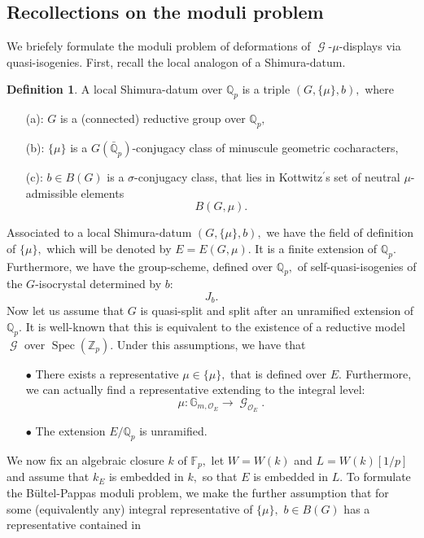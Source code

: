 \documentclass[a4paper,10,5 pt]{amsart}
\theoremstyle{definition}
\newtheorem{Definition}{Definition}
\DeclareMathOperator{\Spec}{Spec}
\DeclareMathOperator{\G}{\mathcal{G}}
\begin{document}
\subsection{Recollections on the moduli problem}
We briefely formulate the moduli problem of deformations of $\G$-$\mu$-displays via quasi-isogenies. First, recall the local analogon of a Shimura-datum.
\begin{Definition}
A local Shimura-datum over $\mathbb{Q}_{p}$ is a triple $(G,\lbrace \mu \rbrace,b),$ where
\begin{enumerate}
\item[(a):] $G$ is a (connected) reductive group over $\mathbb{Q}_{p},$
\item[(b):] $\lbrace \mu \rbrace$ is a $G(\bar{\mathbb{Q}}_{p})$-conjugacy class of minuscule geometric cocharacters,
\item[(c):] $b\in B(G)$ is a $\sigma$-conjugacy class, that lies in Kottwitz$^{\prime}$s set of neutral $\mu$-admissible elements $$B(G,\mu).$$
\end{enumerate}
\end{Definition}
Associated to a local Shimura-datum $(G,\lbrace \mu \rbrace,b),$ we have the field of definition of $\lbrace \mu \rbrace,$ which will be denoted by $E=E(G,\mu).$ It is a finite extension of $\mathbb{Q}_{p}.$ Furthermore, we have the group-scheme, defined over $\mathbb{Q}_{p},$ of self-quasi-isogenies of the $G$-isocrystal determined by $b:$ 
$$
J_{b}.
$$
Now let us assume that $G$ is quasi-split and split after an unramified extension of $\mathbb{Q}_{p}.$ It is well-known that this is equivalent to the existence of a reductive model $\G$ over $\Spec(\mathbb{Z}_{p}).$
Under this assumptions, we have that
\begin{enumerate}
\item[$\bullet$] There exists a representative $\mu \in \lbrace \mu \rbrace,$ that is defined over $E.$ Furthermore, we can actually find a representative extending to the integral level:
$$
\mu\colon \mathbb{G}_{m,\mathcal{O}_{E}}\rightarrow \G_{\mathcal{O}_{E}}.
$$
\item[$\bullet$] The extension $E/\mathbb{Q}_{p}$ is unramified.
\end{enumerate}
We now fix an algebraic closure $k$ of $\mathbb{F}_{p},$ let $W=W(k)$ and $L=W(k)[1/p]$ and assume that $k_{E}$ is embedded in $k,$ so that $E$ is embedded in $L.$
To formulate the Bültel-Pappas moduli problem, we make the further assumption that for some (equivalently any) integral representative of $\lbrace \mu \rbrace,$ $b\in B(G)$ has a representative contained in
\end{document}
